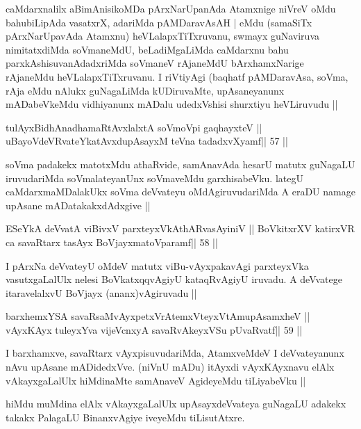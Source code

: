 \begin{artha}
caMdarxnalilx aBimAnisikoMDa pArxNarUpanAda Atamxnige niVreV oMdu bahubiLipAda vasatxrX, adariMda pAMDaravAsAH | eMdu (samaSiTx pArxNarUpavAda Atamxnu) heVLalapxTiTxruvanu, swmayx guNaviruva nimitatxdiMda soVmaneMdU, beLadiMgaLiMda caMdarxnu bahu parxkAshisuvanAdadxriMda soVmaneV rAjaneMdU bArxhamxNarige rAjaneMdu heVLalapxTiTxruvanu. I riVtiyAgi (baqhatf pAMDaravAsa, soVma, rAja eMdu nAlukx guNagaLiMda kUDiruvaMte, upAsaneyanunx mADabeVkeMdu vidhiyanunx mADalu udedxVshisi shurxtiyu heVLiruvudu ||
\end{artha}

\begin{shl}
tulAyxBidhAnadhamaRtAvxlalxtA soVmoV\s pi gaqhayxteV ||
uBayoVdeVRvateYkatAvxdupAsayxM teVna tadadxvXyamf\hfill || 57 ||
\end{shl}

\begin{artha}
soVma padakekx matotxMdu athaRvide, samAnavAda hesarU matutx guNagaLU 
iruvudariMda soVmalateyanUnx soVmaveMdu garxhisabeVku. lategU 
caMdarxmaMDalakUkx soVma deVvateyu oMdAgiruvudariMda A eraDU namage upAsane mADatakakxdAdxgive ||
\end{artha}

\begin{shl}
ESeYkA deVvatA viBivxV parxteyxVkAthARvasAyiniV ||
BoVkitxrXV katirxVR ca savaRtarx tasAyx BoVjayxmatoV\s paramf\hfill || 58 ||
\end{shl}

\begin{artha}
I pArxNa deVvateyU oMdeV matutx viBu-vAyxpakavAgi parxteyxVka 
vasutxgaLalUlx nelesi BoVkatxqqvAgiyU kataqRvAgiyU iruvadu. A deVvatege itaravelalxvU BoVjayx (ananx)vAgiruvadu ||
\end{artha}

\begin{shl}
barxhemxYSA savaRsaMvAyxpetxVrAtemxVteyxVtAmupAsamxheV ||
vAyxKAyx tuleyxYva vijeVcnxyA savaRvAkeyxVSu pUvaRvatf\hfill || 59 ||
\end{shl}

\begin{artha}
I barxhamxve, savaRtarx vAyxpisuvudariMda, AtamxveMdeV I deVvateyanunx nAvu upAsane mADidedxVve. (niVnU mADu) itAyxdi vAyxKAyxnavu elAlx vAkayxgaLalUlx hiMdinaMte samAnaveV AgideyeMdu tiLiyabeVku ||
\end{artha}

\begin{artha}
hiMdu muMdina elAlx vAkayxgaLalUlx upAsayxdeVvateya guNagaLU adakekx takakx PalagaLU BinanxvAgiye iveyeMdu tiLisutAtxre.
\end{artha}

